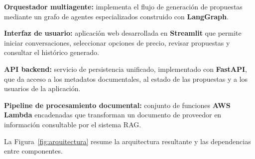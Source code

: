 \begin{tfmbullets}
\item \textbf{Orquestador multiagente:} implementa el flujo de generación de propuestas mediante un grafo de agentes especializados construido con \textbf{LangGraph}.
\item \textbf{Interfaz de usuario:} aplicación web desarrollada en \textbf{Streamlit} que permite iniciar conversaciones, seleccionar opciones de precio, revisar propuestas y consultar el histórico generado.
\item \textbf{API backend:} servicio de persistencia unificado, implementado con \textbf{FastAPI}, que da acceso a los metadatos documentales, al estado de las propuestas y a los usuarios de la aplicación.
\item \textbf{Pipeline de procesamiento documental:} conjunto de funciones \textbf{AWS Lambda} encadenadas que transforman un documento de proveedor en información consultable por el sistema RAG.
\end{tfmbullets}

La Figura~\ref{fig:arquitectura} resume la arquitectura resultante y las dependencias entre componentes.


